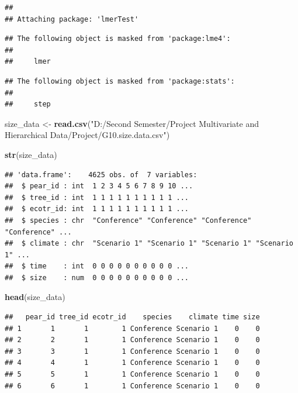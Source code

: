 \documentclass[
]{article}
\newenvironment{Shaded}{\begin{snugshade}}{\end{snugshade}}
\newcommand{\FunctionTok}[1]{\textcolor[rgb]{0.13,0.29,0.53}{\textbf{#1}}}
\newcommand{\NormalTok}[1]{#1}
\newcommand{\OtherTok}[1]{\textcolor[rgb]{0.56,0.35,0.01}{#1}}
\newcommand{\StringTok}[1]{\textcolor[rgb]{0.31,0.60,0.02}{#1}}
\begin{document}
\begin{verbatim}
## 
## Attaching package: 'lmerTest'
\end{verbatim}

\begin{verbatim}
## The following object is masked from 'package:lme4':
## 
##     lmer
\end{verbatim}

\begin{verbatim}
## The following object is masked from 'package:stats':
## 
##     step
\end{verbatim}

\begin{Shaded}
\begin{Highlighting}[]
\NormalTok{size\_data }\OtherTok{\textless{}{-}} \FunctionTok{read.csv}\NormalTok{(}\StringTok{"D:/Second Semester/Project Multivariate and Hierarchical Data/Project/G10.size.data.csv"}\NormalTok{)}
\end{Highlighting}
\end{Shaded}

\begin{Shaded}
\begin{Highlighting}[]
\FunctionTok{str}\NormalTok{(size\_data)}
\end{Highlighting}
\end{Shaded}

\begin{verbatim}
## 'data.frame':    4625 obs. of  7 variables:
##  $ pear_id : int  1 2 3 4 5 6 7 8 9 10 ...
##  $ tree_id : int  1 1 1 1 1 1 1 1 1 1 ...
##  $ ecotr_id: int  1 1 1 1 1 1 1 1 1 1 ...
##  $ species : chr  "Conference" "Conference" "Conference" "Conference" ...
##  $ climate : chr  "Scenario 1" "Scenario 1" "Scenario 1" "Scenario 1" ...
##  $ time    : int  0 0 0 0 0 0 0 0 0 0 ...
##  $ size    : num  0 0 0 0 0 0 0 0 0 0 ...
\end{verbatim}

\begin{Shaded}
\begin{Highlighting}[]
\FunctionTok{head}\NormalTok{(size\_data)}
\end{Highlighting}
\end{Shaded}

\begin{verbatim}
##   pear_id tree_id ecotr_id    species    climate time size
## 1       1       1        1 Conference Scenario 1    0    0
## 2       2       1        1 Conference Scenario 1    0    0
## 3       3       1        1 Conference Scenario 1    0    0
## 4       4       1        1 Conference Scenario 1    0    0
## 5       5       1        1 Conference Scenario 1    0    0
## 6       6       1        1 Conference Scenario 1    0    0
\end{verbatim}
\end{document}
